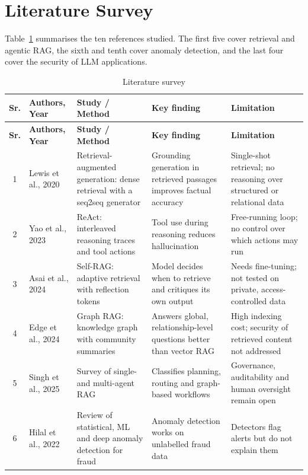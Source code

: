 \documentclass[oneside,a4paper,12pt]{report}
\begin{document}
\section{Literature Survey}
\label{sec:litsurvey}
Table~\ref{tab:litsurvey} summarises the ten references studied. The first five cover retrieval and agentic RAG, the sixth and tenth cover anomaly detection, and the last four cover the security of LLM applications.

{\footnotesize
\begin{longtable}{|c|p{2.2cm}|p{3.2cm}|p{3.2cm}|p{3.3cm}|}
\caption{Literature survey}\label{tab:litsurvey}\\
\hline
\textbf{Sr.} & \textbf{Authors, Year} & \textbf{Study / Method} & \textbf{Key finding} & \textbf{Limitation} \\ \hline
\endfirsthead
\hline
\textbf{Sr.} & \textbf{Authors, Year} & \textbf{Study / Method} & \textbf{Key finding} & \textbf{Limitation} \\ \hline
\endhead
1 & Lewis et al., 2020 \cite{lewis2020rag} & Retrieval-augmented generation: dense retrieval with a seq2seq generator & Grounding generation in retrieved passages improves factual accuracy & Single-shot retrieval; no reasoning over structured or relational data \\ \hline
2 & Yao et al., 2023 \cite{yao2023react} & ReAct: interleaved reasoning traces and tool actions & Tool use during reasoning reduces hallucination & Free-running loop; no control over which actions may run \\ \hline
3 & Asai et al., 2024 \cite{asai2024selfrag} & Self-RAG: adaptive retrieval with reflection tokens & Model decides when to retrieve and critiques its own output & Needs fine-tuning; not tested on private, access-controlled data \\ \hline
4 & Edge et al., 2024 \cite{edge2024graphrag} & Graph RAG: knowledge graph with community summaries & Answers global, relationship-level questions better than vector RAG & High indexing cost; security of retrieved content not addressed \\ \hline
5 & Singh et al., 2025 \cite{singh2025agentic} & Survey of single- and multi-agent RAG & Classifies planning, routing and graph-based workflows & Governance, auditability and human oversight remain open \\ \hline
6 & Hilal et al., 2022 \cite{hilal2022fraud} & Review of statistical, ML and deep anomaly detection for fraud & Anomaly detection works on unlabelled fraud data & Detectors flag alerts but do not explain them \\ \hline

\end{longtable}}
\end{document}
